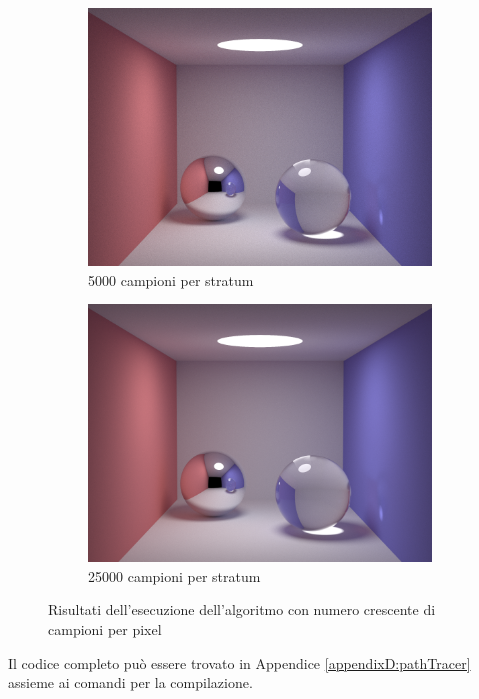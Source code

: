 \begin{figure}[p]
\begin{subfigure}[c]{0.4\linewidth}
	\includegraphics[width=\linewidth]{../assets/appendixD_result_5k.png}
	\caption{5000 campioni per stratum}
    \end{subfigure}\hfill
    \begin{subfigure}[c]{0.4\linewidth}
	\centering
	\includegraphics[width=\linewidth]{../assets/appendixD_result_25k.png}
	\caption{25000 campioni per stratum}
    \end{subfigure}
    \caption{Risultati dell'esecuzione dell'algoritmo con numero crescente di campioni per pixel}
\end{figure}
Il codice completo pu\`o essere trovato in Appendice \ref{appendixD:pathTracer} assieme ai comandi per la compilazione.

